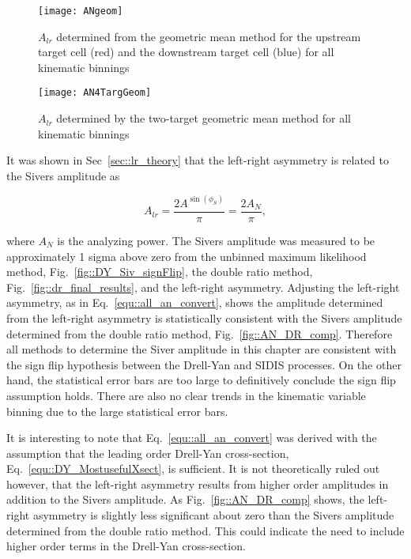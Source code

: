 \begin{figure}[h!t]
  \begin{center}
    \texttt{[image: ANgeom]}
    \caption{$A_{lr}$ determined from the geometric mean method for the upstream
      target cell (red) and the downstream target cell (blue) for all kinematic
      binnings}
    \label{fig::ANgeom}
  \end{center}
\end{figure}

\begin{figure}[h!t]
  \begin{center}
    \texttt{[image: AN4TargGeom]}
    \caption{$A_{lr}$ determined by the two-target geometric mean method
      for all kinematic binnings}
    \label{fig::AN4TargGeom}
  \end{center}
\end{figure}

It was shown in Sec~\ref{sec::lr_theory} that the left-right asymmetry is
related to the Sivers amplitude as

\begin{equation}
  \label{equ::all_an_convert}
  A_{lr} = \frac{2A^{\sin(\phi_S)}}{\pi} = \frac{2A_N}{\pi},
\end{equation}

\noindent
where $A_N$ is the analyzing power.  The Sivers amplitude was measured to be
approximately 1 sigma above zero from the unbinned maximum likelihood method,
Fig.~\ref{fig::DY_Siv_signFlip}, the double ratio method,
Fig.~\ref{fig::dr_final_results}, and the left-right asymmetry.  Adjusting the
left-right asymmetry, as in Eq.~\ref{equ::all_an_convert}, shows the amplitude
determined from the left-right asymmetry is statistically consistent with the
Sivers amplitude determined from the double ratio method,
Fig.~\ref{fig::AN_DR_comp}.  Therefore all methods to determine the Siver
amplitude in this chapter are consistent with the sign flip hypothesis between
the Drell-Yan and SIDIS processes.  On the other hand, the statistical error
bars are too large to definitively conclude the sign flip assumption holds.
There are also no clear trends in the kinematic variable binning due to the
large statistical error bars.

It is interesting to note that Eq.~\ref{equ::all_an_convert} was derived with
the assumption that the leading order Drell-Yan cross-section,
Eq.~\ref{equ::DY_MostusefulXsect}, is sufficient.  It is not theoretically ruled
out however, that the left-right asymmetry results from higher order amplitudes
in addition to the Sivers amplitude.  As Fig.~\ref{fig::AN_DR_comp} shows, the
left-right asymmetry is slightly less significant about zero than the Sivers
amplitude determined from the double ratio method.  This could indicate the need
to include higher order terms in the Drell-Yan cross-section.

